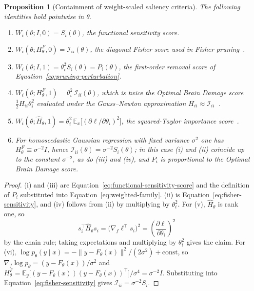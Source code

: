 \documentclass{article}
\newtheorem{proposition}[theorem]{Proposition}
\theoremstyle{definition}
\theoremstyle{remark}
\begin{document}
\begin{proposition}[Containment of weight-scaled saliency criteria]
\label{prop:containment}
The following identities hold pointwise in $\theta$.
\begin{enumerate}
\item[(i)] $W_i(\theta;I,0)=S_i(\theta)$, the functional sensitivity score.
\item[(ii)] $W_i(\theta;H^{F}_\theta,0)=\mathcal I_{ii}(\theta)$, the diagonal
Fisher score used in Fisher pruning~\cite{theis2018fisher}.
\item[(iii)] $W_i(\theta;I,1)=\theta_i^2S_i(\theta)=P_i(\theta)$, the
first-order removal score of
Equation~\eqref{eq:pruning-perturbation}.
\item[(iv)] $W_i(\theta;H^{F}_\theta,1)=\theta_i^2\,\mathcal I_{ii}(\theta)$,
which is twice the Optimal Brain Damage score
$\tfrac12 H_{ii}\theta_i^2$ evaluated under the Gauss--Newton approximation
$H_{ii}\approx\mathcal I_{ii}$~\cite{lecun1990obd}.
\item[(v)] $W_i(\theta;\widehat H_\theta,1)
=\theta_i^2\,\mathbb E_x\bigl[(\partial\ell/\partial\theta_i)^2\bigr]$, the
squared-Taylor importance score~\cite{molchanov2019importance}.
\item[(vi)] For homoscedastic Gaussian regression with fixed variance
$\sigma^2$ one has $H^{F}_\theta\equiv\sigma^{-2}I$, hence
$\mathcal I_{ii}(\theta)=\sigma^{-2}S_i(\theta)$; in this case (i) and (ii)
coincide up to the constant $\sigma^{-2}$, as do (iii) and (iv), and $P_i$ is
proportional to the Optimal Brain Damage score.
\end{enumerate}
\end{proposition}

\begin{proof}
(i) and (iii) are Equation~\eqref{eq:functional-sensitivity-score} and the
definition of $P_i$ substituted into
Equation~\eqref{eq:weighted-family}. (ii) is
Equation~\eqref{eq:fisher-sensitivity}, and (iv) follows from (ii) by
multiplying by $\theta_i^2$. For (v), $\widehat H_\theta$ is rank one, so
\[
s_i^\top\widehat H_\theta s_i
=
\bigl(\nabla_f\ell^\top s_i\bigr)^2
=
\left(\frac{\partial\ell}{\partial\theta_i}\right)^{\!2}
\]
by the chain rule; taking expectations and multiplying by $\theta_i^2$ gives the
claim. For (vi), $\log p_\theta(y\mid x)
=-\|y-F_\theta(x)\|^2/(2\sigma^2)+\text{const}$, so
$\nabla_f\log p_\theta=(y-F_\theta(x))/\sigma^2$ and
$H^{F}_\theta
=\mathbb E_{y}\bigl[(y-F_\theta(x))(y-F_\theta(x))^\top\bigr]/\sigma^4
=\sigma^{-2}I$. Substituting into
Equation~\eqref{eq:fisher-sensitivity} gives
$\mathcal I_{ii}=\sigma^{-2}S_i$.
\end{proof}
\end{document}
